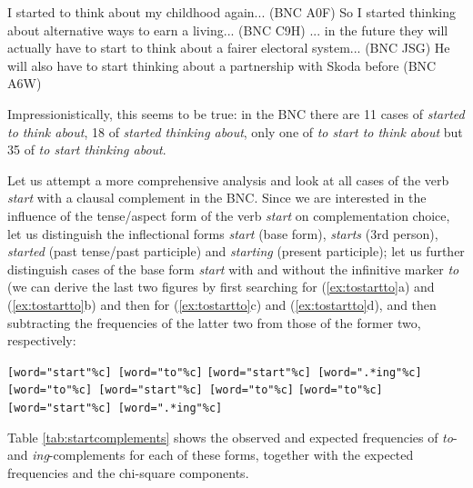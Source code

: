 \begin{exe}
\ex
\begin{xlist} 
\label{ex:startoing}
\ex I started to think about my childhood again... (BNC A0F)
\ex So I started thinking about alternative ways to earn a living... (BNC C9H)
\ex ... in the future they will actually have to start to think about a fairer electoral system... (BNC JSG)
\ex He will also have to start thinking about a partnership with Skoda before (BNC A6W)
\end{xlist}
\end{exe}

Impressionistically, this seems to be true: in the BNC there are 11 cases of \textit{started to think about}, 18 of \textit{started thinking about}, only one of \textit{to start to think about} but 35 of \textit{to start thinking about}.

Let us attempt a more comprehensive analysis and look at all cases of the verb \textit{start} with a clausal complement in the BNC. Since we are interested in the influence of the tense/aspect form of the verb \textit{start} on complementation choice, let us distinguish the inflectional forms \textit{start} (base form), \textit{starts} (3rd person), \textit{started} (past tense/past participle) and \textit{starting} (present participle); let us further distinguish cases of the base form \textit{start} with and without the infinitive marker \textit{to} (we can derive the last two figures by first searching for (\ref{ex:tostartto}a) and (\ref{ex:tostartto}b) and then for (\ref{ex:tostartto}c) and (\ref{ex:tostartto}d), and then subtracting the frequencies of the latter two from those of the former two, respectively:

\begin{exe}
\ex
\begin{xlist} 
\label{ex:tostartto}
\ex \texttt{[word="start"\%c] [word="to"\%c]}
\ex \texttt{[word="start"\%c] [word=".*ing"\%c]} 
\ex \texttt{[word="to"\%c] [word="start"\%c] [word="to"\%c]}
\ex \texttt{[word="to"\%c] [word="start"\%c] [word=".*ing"\%c]}
\end{xlist}
\end{exe}

Table \ref{tab:startcomplements} shows the observed and expected frequencies of \textit{to}- and \textit{ing}\hyp{}complements for each of these forms, together with the expected frequencies and the chi-square components.

